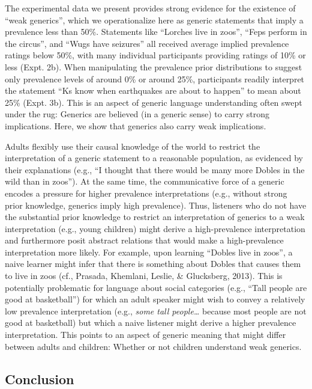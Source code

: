 \documentclass[floatsintext,doc]{apa6}
\begin{document}
The experimental data we present provides strong evidence for the existence of \enquote{weak generics}, which we operationalize here as generic statements that imply a prevalence less than 50\%.
Statements like \enquote{Lorches live in zoos}, \enquote{Feps perform in the circus}, and \enquote{Wugs have seizures} all received average implied prevalence ratings below 50\%, with many individual participants providing ratings of 10\% or less (Expt. 2b).
When manipulating the prevalence prior distributions to suggest only prevalence levels of around 0\% or around 25\%, participants readily interpret the statement \enquote{Ks know when earthquakes are about to happen} to mean about 25\% (Expt. 3b).
This is an aspect of generic language understanding often swept under the rug: Generics are believed (in a generic sense) to carry strong implications.
Here, we show that generics also carry weak implications.

Adults flexibly use their causal knowledge of the world to restrict the interpretation of a generic statement to a reasonable population, as evidenced by their explanations (e.g., \enquote{I thought that there would be many more Dobles in the wild than in zoos}).
At the same time, the communicative force of a generic encodes a pressure for higher prevalence interpretations (e.g., without strong prior knowledge, generics imply high prevalence).
Thus, listeners who do not have the substantial prior knowledge to restrict an interpretation of generics to a weak interpretation (e.g., young children) might derive a high-prevalence interpretation and furthermore posit abstract relations that would make a high-prevalence interpretation more likely.
For example, upon learning \enquote{Dobles live in zoos}, a naive learner might infer that there is something about Dobles that causes them to live in zoos (cf., Prasada, Khemlani, Leslie, \& Glucksberg, 2013).
This is potentially problematic for language about social categories (e.g., \enquote{Tall people are good at basketball}) for which an adult speaker might wish to convey a relatively low prevalence interpretation (e.g., \emph{some tall people\ldots{}} because most people are not good at basketball) but which a naive listener might derive a higher prevalence interpretation.
This points to an aspect of generic meaning that might differ between adults and children: Whether or not children understand weak generics.

\hypertarget{conclusion}{%
\subsection{Conclusion}\label{conclusion}}
\end{document}
